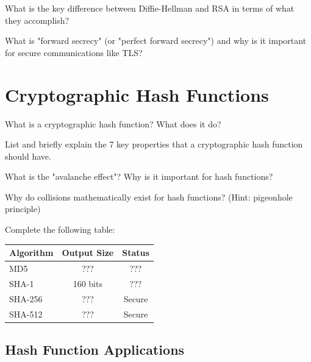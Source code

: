 \documentclass[11pt,a4paper]{report}
\begin{document}
\begin{ex}
What is the key difference between Diffie-Hellman and RSA in terms of what they accomplish?
\end{ex}

\begin{ex}
What is "forward secrecy" (or "perfect forward secrecy") and why is it important for secure communications like TLS?
\end{ex}

\section{Cryptographic Hash Functions}

\begin{ex}
What is a cryptographic hash function? What does it do?
\end{ex}

\begin{ex}
List and briefly explain the 7 key properties that a cryptographic hash function should have.
\end{ex}

\begin{ex}
What is the "avalanche effect"? Why is it important for hash functions?
\end{ex}

\begin{ex}
Why do collisions mathematically exist for hash functions? (Hint: pigeonhole principle)
\end{ex}

\begin{ex}
Complete the following table:

\begin{center}
\begin{tabular}{|l|c|c|}
\hline
\textbf{Algorithm} & \textbf{Output Size} & \textbf{Status} \\
\hline
MD5 & ??? & ??? \\
SHA-1 & 160 bits & ??? \\
SHA-256 & ??? & Secure \\
SHA-512 & ??? & Secure \\
\hline
\end{tabular}
\end{center}
\end{ex}

\subsection{Hash Function Applications}
\end{document}
